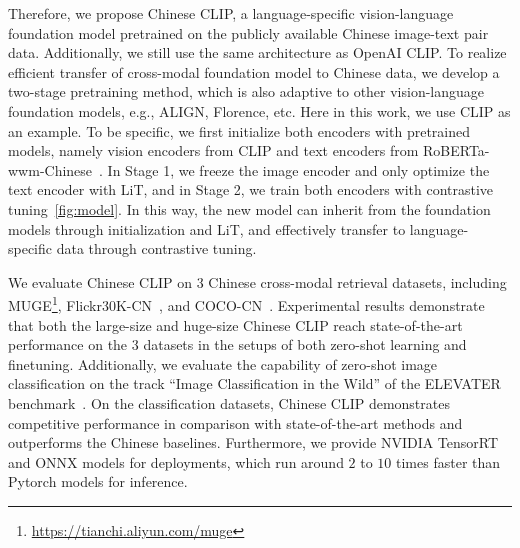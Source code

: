 Therefore, we propose Chinese CLIP, a language-specific vision-language foundation model pretrained on the publicly available Chinese image-text pair data.  
Additionally, we still use the same architecture as OpenAI CLIP.  
To realize efficient transfer of cross-modal foundation model to Chinese data, we develop a two-stage pretraining method, which is also adaptive to other vision-language foundation models, e.g., ALIGN, Florence, etc. 
Here in this work, we use CLIP as an example. 
To be specific, we first initialize both encoders with pretrained models, namely vision encoders from CLIP and text encoders from RoBERTa-wwm-Chinese~\citep{wwm}. In Stage 1, we freeze the image encoder and only optimize the text encoder with LiT, and in Stage 2, we train both encoders with contrastive tuning~\ref{fig:model}. 
In this way, the new model can inherit from the foundation models through initialization and LiT, and effectively transfer to language-specific data through contrastive tuning. 

We evaluate Chinese CLIP on $3$ Chinese cross-modal retrieval datasets, including MUGE\footnote{\url{https://tianchi.aliyun.com/muge}}, Flickr30K-CN~\citep{flickr30k-cn}, and COCO-CN~\citep{coco-cn}. Experimental results demonstrate that both the large-size and huge-size Chinese CLIP reach state-of-the-art performance on the $3$ datasets in the setups of both zero-shot learning and finetuning. 
Additionally, we evaluate the capability of zero-shot image classification on the track ``Image Classification in the Wild'' of the ELEVATER benchmark~\citep{elevater}. 
On the classification datasets, Chinese CLIP demonstrates competitive performance in comparison with state-of-the-art methods and outperforms the Chinese baselines. 
Furthermore, we provide NVIDIA TensorRT and ONNX models for deployments, which run around $2$ to $10$ times faster than Pytorch models for inference. 


